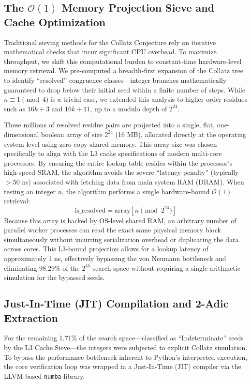 \documentclass[11pt, a4paper]{article}
\theoremstyle{definition}
\begin{document}
\subsection{The \texorpdfstring{$\mathcal{O}(1)$}{O(1)} Memory Projection Sieve and Cache Optimization}

Traditional sieving methods for the Collatz Conjecture rely on iterative mathematical checks that incur significant CPU overhead. To maximize throughput, we shift this computational burden to constant-time hardware-level memory retrieval. We pre-computed a breadth-first expansion of the Collatz tree to identify ``resolved'' congruence classes—integer branches mathematically guaranteed to drop below their initial seed within a finite number of steps. While $n \equiv 1 \pmod{4}$ is a trivial case, we extended this analysis to higher-order residues such as $16k+3$ and $16k+11$, up to a modulo depth of $2^{24}$.

These millions of resolved residue pairs are projected into a single, flat, one-dimensional boolean array of size $2^{24}$ (16 MB), allocated directly at the operating system level using zero-copy shared memory. This array size was chosen specifically to align with the L3 cache specifications of modern multi-core processors. By ensuring the entire lookup table resides within the processor's high-speed SRAM, the algorithm avoids the severe ``latency penalty'' (typically $>50$ ns) associated with fetching data from main system RAM (DRAM). When testing an integer $n$, the algorithm performs a single hardware-bound $\mathcal{O}(1)$ retrieval: 
\begin{equation}
\text{is\_resolved} = \text{array}[n \pmod{2^{24}}]
\end{equation}
Because this array is backed by OS-level shared RAM, an arbitrary number of parallel worker processes can read the exact same physical memory block simultaneously without incurring serialization overhead or duplicating the data across cores. This L3-bound projection allows for a lookup latency of approximately 1 ns, effectively bypassing the von Neumann bottleneck and eliminating 98.29\% of the $2^{45}$ search space without requiring a single arithmetic simulation for the bypassed seeds.

\subsection{Just-In-Time (JIT) Compilation and 2-Adic Extraction}

For the remaining 1.71\% of the search space---classified as ``Indeterminate'' seeds by the L3 Cache Sieve---the integers were subjected to explicit Collatz simulation. To bypass the performance bottleneck inherent to Python's interpreted execution, the core verification loop was wrapped in a Just-In-Time (JIT) compiler via the LLVM-based \texttt{numba} library.
\end{document}
